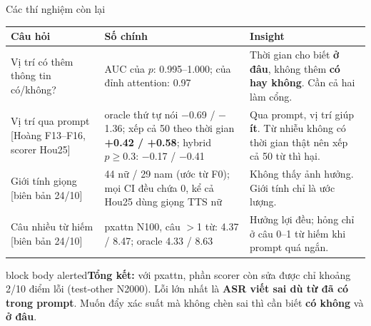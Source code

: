 \documentclass[aspectratio=169,xcolor=table]{beamer}
\newcommand{\hi}[1]{\textcolor{Primary}{\textbf{#1}}}
\newcommand{\bad}[1]{\textcolor{RiskRed}{\textbf{#1}}}
\newcommand{\src}[1]{{\tiny\color{TextGray}[#1]}}
\newcommand{\nbox}[2][block body]{\begin{beamercolorbox}[sep=0.45em,rounded=true]{#1}\footnotesize #2\end{beamercolorbox}}
\begin{document}
\begin{frame}{Các thí nghiệm còn lại}
\centering\scriptsize\setlength{\tabcolsep}{3pt}
\begin{tabular}{L{3.3cm}L{5.6cm}L{5.3cm}}
\toprule
Câu hỏi & Số chính & Insight\\
\midrule
Vị trí có thêm thông tin có/không? & AUC của $p$: 0.995--1.000; của đỉnh attention: 0.97 & Thời gian cho biết \textbf{ở đâu}, không thêm \textbf{có hay không}. Cần cả hai làm cổng. \\
\addlinespace
Vị trí qua prompt \src{Hoàng F13--F16, scorer Hou25} & oracle thứ tự nói $-$0.69 / $-$1.36; xếp cả 50 theo thời gian \bad{+0.42 / +0.58}; hybrid $p\geq0.3$: $-$0.17 / $-$0.41 & Qua prompt, vị trí giúp \textbf{ít}. Từ nhiễu không có thời gian thật nên xếp cả 50 từ thì hại. \\
\addlinespace
Giới tính giọng \src{biên bản 24/10} & 44 nữ / 29 nam (ước từ F0); mọi CI đều chứa 0, kể cả Hou25 dùng giọng TTS nữ & Không thấy ảnh hưởng. Giới tính chỉ là ước lượng. \\
\addlinespace
Câu nhiều từ hiếm \src{biên bản 24/10} & pxattn N100, câu $>$1 từ: 4.37 / 8.47; oracle 4.33 / 8.63 & Hưởng lợi đều; hỏng chỉ ở câu 0--1 từ hiếm khi prompt quá ngắn. \\
\bottomrule
\end{tabular}\par
\vspace{0.1cm}\raggedright
\nbox[block body alerted]{\textbf{Tổng kết:} với pxattn, phần scorer còn sửa được chỉ khoảng 2/10 điểm lỗi (test-other N2000). Lỗi lớn nhất là \hi{ASR viết sai dù từ đã có trong prompt}. Muốn đẩy xác suất mà không chèn sai thì cần biết \hi{có không} và \hi{ở đâu}.}
\end{frame}

\end{document}
